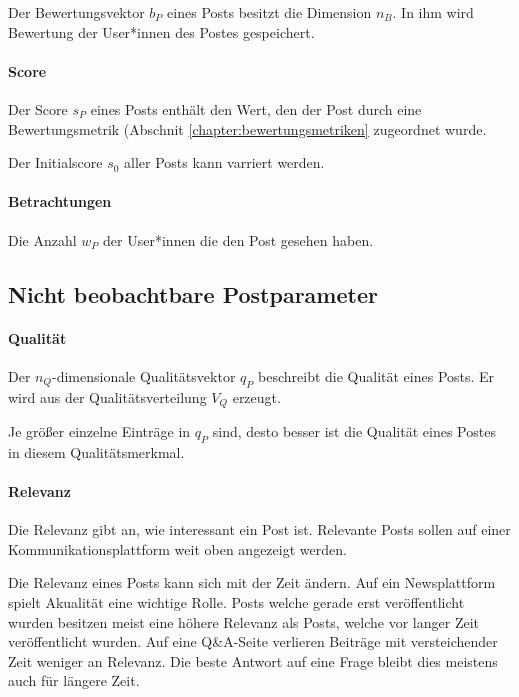 Der Bewertungsvektor $b_P$ eines Posts besitzt die Dimension $n_B$. In ihm wird Bewertung der User*innen des Postes gespeichert.

\paragraph{Score}

Der Score $s_P$ eines Posts enthält den Wert, den der Post durch eine Bewertungsmetrik (Abschnit \ref{chapter:bewertungsmetriken} zugeordnet wurde.

Der Initialscore $s_{0}$ aller Posts kann varriert werden.

\paragraph{Betrachtungen}

Die Anzahl $w_P$ der User*innen  die den Post gesehen haben.

\subsection{Nicht beobachtbare Postparameter}

\paragraph{Qualität}
\label{pqualitaet}

Der $n_Q$-dimensionale Qualitätsvektor $q_P$ beschreibt die Qualität eines Posts. Er wird aus der Qualitätsverteilung $V_Q$ erzeugt. 

Je größer einzelne Einträge in $q_P$ sind, desto besser ist die Qualität eines Postes in diesem Qualitätsmerkmal.


\paragraph{Relevanz}

Die Relevanz gibt an, wie interessant ein Post ist. Relevante Posts sollen auf einer Kommunikationsplattform weit oben angezeigt werden.

Die Relevanz eines Posts kann sich mit der Zeit ändern. Auf ein Newsplattform spielt Akualität eine wichtige Rolle. Posts welche gerade erst veröffentlicht wurden besitzen meist eine höhere Relevanz als Posts, welche vor langer Zeit veröffentlicht wurden. Auf eine Q\&A-Seite verlieren Beiträge mit versteichender Zeit weniger an Relevanz. Die beste Antwort auf eine Frage bleibt dies meistens auch für längere Zeit.

